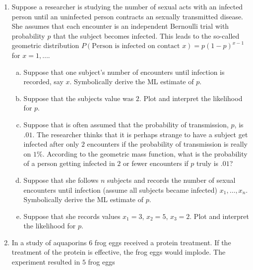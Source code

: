 \documentclass[12pt]{article}
\begin{document}
\begin{enumerate}[Problem 1.]
\begin{enumerate}[a.]
    (Aside) This problem highlights a distinction between the
    likelihood and the P-value. The likelihood and the MLE are the
    same regardless of the experiment. That is to say, the likelihood
    only seems to care that you saw $10$ coin flips, $7$ of which were
    heads. Flip's intention about when he stopped flipping the coin,
    either at $10$ fixed trials or until he obtained $3$ tails, are
    irrelevant as far as the likelihood is concerned. The P-value, in
    comparison, does depend on Flip's intentions.
  \end{enumerate}
\item  Suppose a researcher is studying the number of sexual
  acts with an infected person until an uninfected person contracts an
  sexually transmitted disease. She assumes that each encounter is an
  independent Bernoulli trial with probability $p$ that the subject
  becomes infected. This leads to the so-called geometric distribution
  $P(\mbox{Person is infected on contact } x) = p(1 - p)^{x-1}$ for
  $x=1,\ldots$.
  \begin{enumerate}[a.]
  \item Suppose that one subject's number of encounters until
    infection is recorded, say $x$. Symbolically derive the ML
    estimate of $p$.
  \item Suppose that the subjects value was $2$. Plot and interpret
    the likelihood for $p$.
  \item Suppose that is often assumed that the probability of
    transmission, $p$, is $.01$. The researcher thinks that it is
    perhaps strange to have a subject get infected after only $2$
    encounters if the probability of transmission is really on
    $1\%$. According to the geometric mass function, what is the
    probability of a person getting infected in $2$ or fewer
    encounters if $p$ truly is $.01$?
  \item Suppose that she follows $n$ subjects and records the number
    of sexual encounters until infection (assume all subjects became
    infected) $x_1,\ldots,x_n$. Symbolically derive the ML
    estimate of $p$.
  \item Suppose that she records values $x_1 = 3$, $x_2 = 5$, $x_3 = 2$.
    Plot and interpret the likelihood for $p$.
  \end{enumerate}
\item  In a study of aquaporins $6$ frog eggs received a protein
  treatment. If the treatment of the protein is effective, the frog
  eggs would implode. The experiment resulted in $5$ frog eggs

\end{enumerate}
\end{document}
